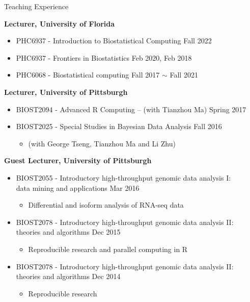 \documentclass{resume} %
\begin{document}
\begin{rSection}{Teaching Experience }

\textbf{Lecturer, University of Florida}
\begin{itemize}[noitemsep,topsep=0pt]
\item PHC6937 - Introduction to Biostatistical Computing	 \hfill Fall 2022
\item PHC6937 - Frontiers in Biostatistics \hfill Feb 2020, Feb 2018
\item PHC6068 - Biostatistical computing \hfill Fall 2017 $\sim$ Fall 2021
\end{itemize}


\textbf{Lecturer, University of Pittsburgh}
\begin{itemize}[noitemsep,topsep=0pt]
\item BIOST2094 - Advanced R Computing -- (with Tianzhou Ma) \hfill Spring 2017
\item BIOST2025 - Special Studies in Bayesian Data Analysis  \hfill Fall 2016
\begin{itemize}[noitemsep,topsep=0pt]
\item{(with George Tseng, Tianzhou Ma and Li Zhu)}
\end{itemize}
\end{itemize}


\textbf{Guest Lecturer, University of Pittsburgh}
\begin{itemize}[noitemsep,topsep=0pt]
\item BIOST2055 - Introductory high-throughput genomic data analysis I: \\data mining and applications \hfill Mar 2016
\begin{itemize}[noitemsep,topsep=0pt]
\item{Differential and isoform analysis of RNA-seq data}
\end{itemize}
\item BIOST2078 - Introductory high-throughput genomic data analysis II: \\theories and algorithms  \hfill Dec 2015
\begin{itemize}[noitemsep,topsep=0pt]
\item{Reproducible research and parallel computing in R}
\end{itemize}
\item BIOST2078 - Introductory high-throughput genomic data analysis II: \\theories and algorithms  \hfill Dec 2014
\begin{itemize}[noitemsep,topsep=0pt]
\item{Reproducible research}
\end{itemize}
\end{itemize}


\end{rSection}
\end{document}
